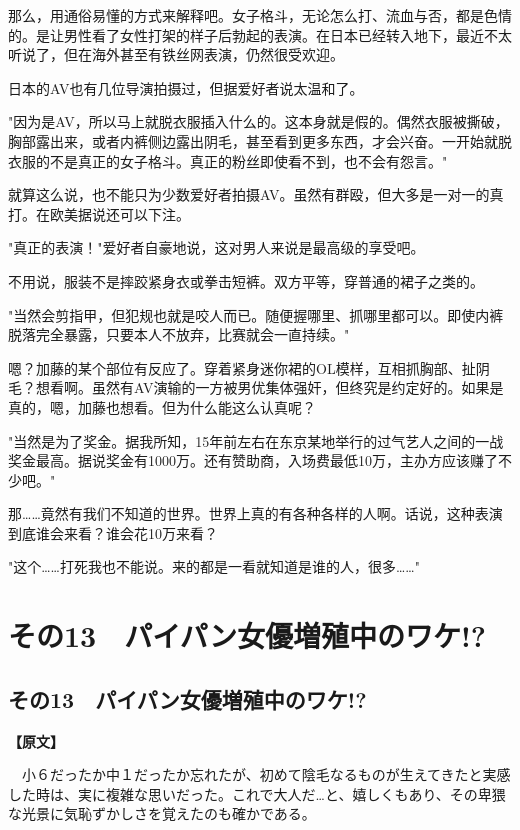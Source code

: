 \documentclass[12pt,UTF8]{ctexbook}
\begin{document}
{{那么，用通俗易懂的方式来解释吧。女子格斗，无论怎么打、流血与否，都是色情的。是让男性看了女性打架的样子后勃起的表演。在日本已经转入地下，最近不太听说了，但在海外甚至有铁丝网表演，仍然很受欢迎。

日本的AV也有几位导演拍摄过，但据爱好者说太温和了。

"因为是AV，所以马上就脱衣服插入什么的。这本身就是假的。偶然衣服被撕破，胸部露出来，或者内裤侧边露出阴毛，甚至看到更多东西，才会兴奋。一开始就脱衣服的不是真正的女子格斗。真正的粉丝即使看不到，也不会有怨言。"

就算这么说，也不能只为少数爱好者拍摄AV。虽然有群殴，但大多是一对一的真打。在欧美据说还可以下注。

"真正的表演！"爱好者自豪地说，这对男人来说是最高级的享受吧。

不用说，服装不是摔跤紧身衣或拳击短裤。双方平等，穿普通的裙子之类的。

"当然会剪指甲，但犯规也就是咬人而已。随便握哪里、抓哪里都可以。即使内裤脱落完全暴露，只要本人不放弃，比赛就会一直持续。"

嗯？加藤的某个部位有反应了。穿着紧身迷你裙的OL模样，互相抓胸部、扯阴毛？想看啊。虽然有AV演输的一方被男优集体强奸，但终究是约定好的。如果是真的，嗯，加藤也想看。但为什么能这么认真呢？

"当然是为了奖金。据我所知，15年前左右在东京某地举行的过气艺人之间的一战奖金最高。据说奖金有1000万。还有赞助商，入场费最低10万，主办方应该赚了不少吧。"

那……竟然有我们不知道的世界。世界上真的有各种各样的人啊。话说，这种表演到底谁会来看？谁会花10万来看？

"这个……打死我也不能说。来的都是一看就知道是谁的人，很多……"
}

\chapter{その13　パイパン女優増殖中のワケ!?}
\label{chap:13}

\section{その13　パイパン女優増殖中のワケ!?}

\vspace{1ex}
\parbox{0.9\linewidth}{
\textbf{【原文】}\par

　小６だったか中１だったか忘れたが、初めて陰毛なるものが生えてきたと実感した時は、実に複雑な思いだった。これで大人だ…と、嬉しくもあり、その卑猥な光景に気恥ずかしさを覚えたのも確かである。

}}
\end{document}
